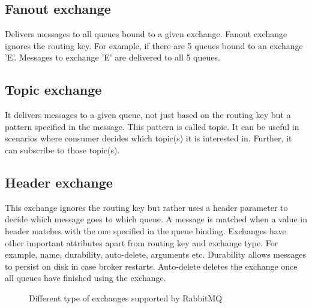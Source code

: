 \documentclass[9pt,twocolumn,twoside]{styles/osajnl}
\begin{document}
\subsection{Fanout exchange}
Delivers messages to all queues bound to a given exchange. Fanout exchange
ignores the routing key. For example, if there are 5 queues bound to an exchange
'E'.  Messages to exchange 'E' are delivered to all 5 queues.

\subsection{Topic exchange}
It delivers messages to a given queue, not just based on the routing key but a
pattern specified in the message. This pattern is called topic. It can be useful
in scenarios where consumer decides which topic(s) it is interested in.
Further, it can subscribe to those topic(s).

\subsection{Header exchange}
This exchange ignores the routing key but rather uses a header parameter to
decide which message goes to which queue. A message is matched when a value in
header matches with the one specified in the queue binding. Exchanges have other
important attributes apart from routing key and exchange type. For example,
name, durability, auto-delete, arguments etc. Durability allows messages to
persist on disk in case broker restarts. Auto-delete deletes the exchange once
all queues have finished using the exchange.

\begin{figure}[htbp]
\centering
{}
\caption{Different type of exchanges supported by
RabbitMQ\cite{www-rabbitmq-Johan}}
\label{fig:false-color}
\end{figure}
\end{document}

